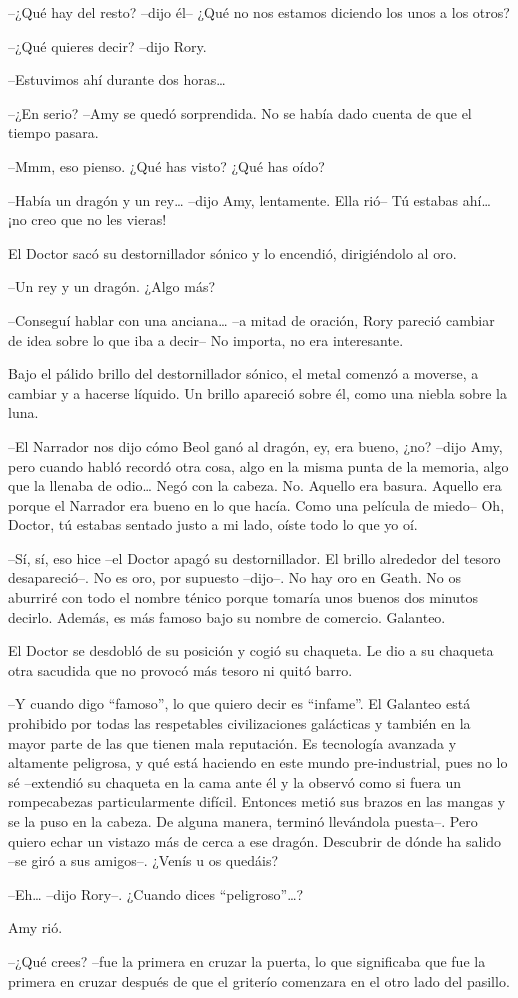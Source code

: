 {--¿Qué hay del resto? --dijo él-- ¿Qué no nos estamos diciendo los
unos a los otros?}

{--¿Qué quieres decir? --dijo Rory.}

{--Estuvimos ahí durante dos horas\ldots{}}

{--¿En serio? --Amy se quedó sorprendida. No se había dado cuenta de
que el tiempo pasara.}

{--Mmm, eso pienso. ¿Qué has visto? ¿Qué has oído?}

{--Había un dragón y un rey\ldots{} --dijo Amy, lentamente. Ella rió--
	Tú estabas ahí\ldots{} ¡no creo que no les vieras!}

{El Doctor sacó su destornillador sónico y lo encendió, dirigiéndolo al
oro.}

{--Un rey y un dragón. ¿Algo más?}

{--Conseguí hablar con una anciana\ldots{} --a mitad de oración, Rory
	pareció cambiar de idea sobre lo que iba a decir-- No importa, no era
interesante.}

{Bajo el pálido brillo del destornillador sónico, el metal comenzó a
	moverse, a cambiar y a hacerse líquido. Un brillo apareció sobre él,
como una niebla sobre la luna.}

{--El Narrador nos dijo cómo Beol ganó al dragón, ey, era bueno, ¿no?
	--dijo Amy, pero cuando habló recordó otra cosa, algo en la misma punta
	de la memoria, algo que la llenaba de odio\ldots{} Negó con la cabeza.
	No. Aquello era basura. Aquello era porque el Narrador era bueno en lo
	que hacía. Como una película de miedo-- Oh, Doctor, tú estabas sentado
justo a mi lado, oíste todo lo que yo oí.}

{--Sí, sí, eso hice --el Doctor apagó su destornillador. El brillo
	alrededor del tesoro desapareció--. No es oro, por supuesto --dijo--. No
	hay oro en Geath. No os aburriré con todo el nombre ténico porque
	tomaría unos buenos dos minutos decirlo. Además, es más famoso bajo su
nombre de comercio. Galanteo.}

{El Doctor se desdobló de su posición y cogió su chaqueta. Le dio a su
chaqueta otra sacudida que no provocó más tesoro ni quitó barro.}

{--Y cuando digo ``famoso'', lo que quiero decir es ``infame''. El
	Galanteo está prohibido por todas las respetables civilizaciones
	galácticas y también en la mayor parte de las que tienen mala
	reputación. Es tecnología avanzada y altamente peligrosa, y qué está
	haciendo en este mundo pre-industrial, pues no lo sé --extendió su
	chaqueta en la cama ante él y la observó como si fuera un rompecabezas
	particularmente difícil. Entonces metió sus brazos en las mangas y se la
	puso en la cabeza. De alguna manera, terminó llevándola puesta--. Pero
	quiero echar un vistazo más de cerca a ese dragón. Descubrir de dónde ha
salido --se giró a sus amigos--. ¿Venís u os quedáis?}

{--Eh\ldots{} --dijo Rory--. ¿Cuando dices ``peligroso''\ldots{}?}

{Amy rió.}

{--¿Qué crees? --fue la primera en cruzar la puerta, lo que
	significaba que fue la primera en cruzar después de que el griterío
comenzara en el otro lado del pasillo.}
